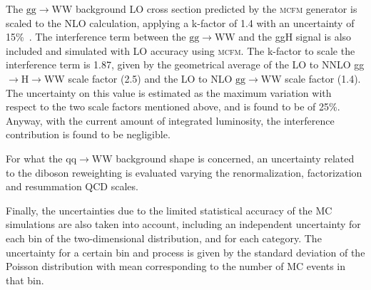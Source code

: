 The $\mathrm{gg}\to\mathrm{WW}$ background LO cross section predicted by the \textsc{mcfm} generator is scaled to the NLO calculation, applying a k-factor of 1.4 with an uncertainty of 15\%~\cite{Caola:2015rqy}. The interference term between the $\mathrm{gg}\to\mathrm{WW}$ and the ggH signal is also included and simulated with LO accuracy using \textsc{mcfm}. The k-factor to scale the interference term is 1.87, given by the geometrical average of the LO to NNLO gg$\to$H$\to$WW scale factor (2.5) and the LO to NLO $\mathrm{gg}\to\mathrm{WW}$ scale factor (1.4). The uncertainty on this value is estimated as the maximum variation with respect to the two scale factors mentioned above, and is found to be of 25\%. Anyway, with the current amount of integrated luminosity, the interference contribution is found to be negligible.

For what the $\mathrm{qq}\to\mathrm{WW}$ background shape is concerned, an uncertainty related to the diboson \pt reweighting is evaluated varying the renormalization, factorization and resummation QCD scales.

Finally, the uncertainties due to the limited statistical accuracy of the MC simulations are also taken into account, including an independent uncertainty for each bin of the two-dimensional distribution, and for each category. The uncertainty for a certain bin and process is given by the standard deviation of the Poisson distribution with mean corresponding to the number of MC events in that bin.


 
